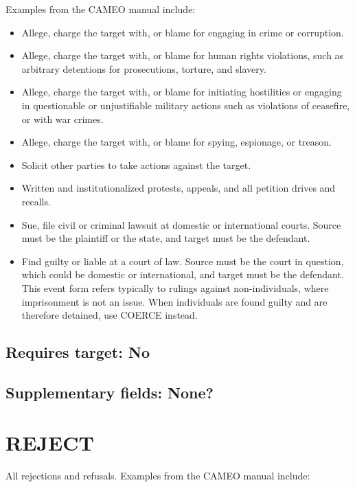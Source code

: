\documentclass[11pt]{report}
\newcommand{\plcat}[1]{\textsf{#1}}
\begin{document}
Examples from the CAMEO manual include:

\begin{itemize}
\item  Allege, charge the target with, or blame for engaging in crime or corruption.
\item Allege, charge the target with, or blame for human rights violations, such as arbitrary detentions for prosecutions, torture, and slavery.
\item Allege, charge the target with, or blame for initiating hostilities or engaging in questionable or unjustifiable military actions such as violations of ceasefire, or with war crimes.
\item Allege, charge the target with, or blame for spying, espionage, or treason.
\item Solicit other parties to take actions against the target.
\item Written and institutionalized protests, appeals, and all petition drives and recalls. %
\item Sue, file civil or criminal lawsuit at domestic or international courts. Source must be the plaintiff or the state, and target must be the defendant.
\item Find guilty or liable at a court of law. Source must be the court in question, which could be domestic or international, and target must be the defendant. This event form refers typically to rulings against non-individuals, where imprisonment is not an issue. When individuals are found guilty and are therefore detained, use \plcat{COERCE} instead.

\end{itemize}

\subsection{Requires target: No}

\subsection{Supplementary fields: None?}

\newpage  


\section{REJECT}

All rejections and refusals. Examples from the CAMEO manual include:
\end{document}
